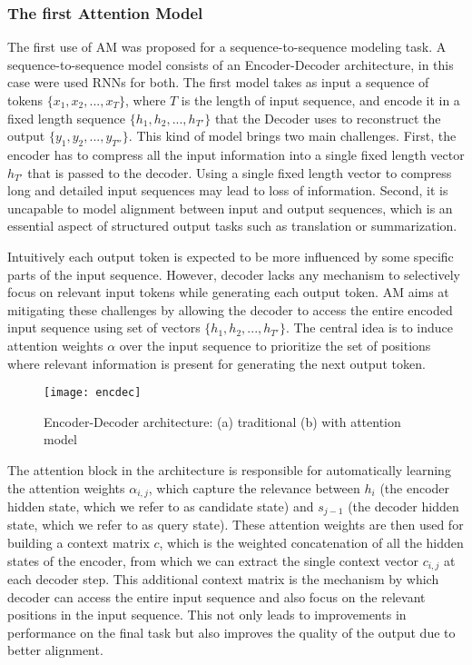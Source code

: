\documentclass[11pt]{article}
\begin{document}
\subsubsection{The first Attention Model}
The first use of AM\cite{Bahdanau}  was proposed for a sequence-to-sequence modeling task. A sequence-to-sequence model consists of an Encoder-Decoder architecture, in this case were used RNNs for both. The first model takes as input a sequence of tokens $\{x_1, x_2, ..., x_T \}$, where $T$ is the length of input sequence, and encode it in a fixed length sequence $\{h_1, h_2, ..., h_{T'} \}$ that the Decoder uses to reconstruct the output $\{y_1, y_2, ..., y_{T''} \}$. This kind of model brings two main challenges. First, the encoder has to compress all the input information into a single fixed length vector $h_{T'}$ that is passed to the decoder. Using a single fixed length vector to compress long and detailed input sequences may lead to loss of information\cite{cho}. Second, it is uncapable to model alignment between input and output sequences, which is an essential aspect of structured output tasks such as translation or summarization\cite{young}. 

Intuitively each output token is expected to be more influenced by some specific parts of the input sequence. However, decoder lacks any mechanism to selectively focus on relevant input tokens while generating each output token. AM aims at mitigating these challenges by allowing the decoder to access the entire encoded input sequence using set of vectors $\{h_1, h_2, ..., h_{T'} \}$. The central idea is to induce attention weights $\alpha$ over the input sequence to prioritize the set of positions where relevant information is present for generating the next output token. 

\begin{figure}[h]
\centerline{\texttt{[image: encdec]}}
\caption{Encoder-Decoder architecture: (a) traditional (b) with attention model}
\label{fig}
\end{figure}

The attention block in the architecture is responsible for automatically learning the attention weights $\alpha_{i,j}$, which capture the relevance between $h_i$ (the encoder hidden state, which we refer to as candidate state) and $s_{j-1}$ (the decoder hidden state, which we refer to as query state). These attention weights are then used for building a context matrix $c$, which is the weighted concatenation of all the hidden states of the encoder, from which we can extract the single context vector $c_{i,j}$ at each decoder step. This additional context matrix is the mechanism by which decoder can access the entire input sequence and also focus on the relevant positions in the input sequence. This not only leads to improvements in performance on the final task but also improves the quality of the output due to better alignment.  
\end{document}
